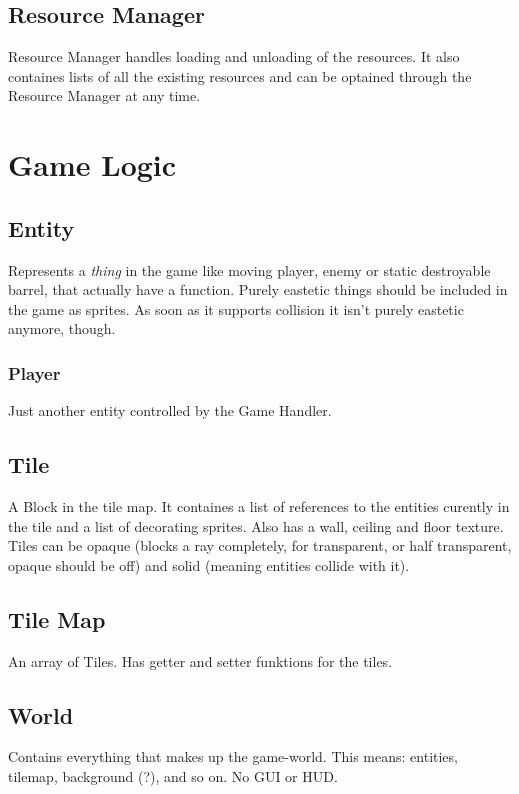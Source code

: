 \documentclass[11pt,a4paper,notitlepage]{article}
\begin{document}
\subsection{Resource Manager}
Resource Manager handles loading and unloading of the resources. It also containes lists of all the existing resources and can be optained through the Resource Manager at any time.

\section{Game Logic}

\subsection{Entity}
Represents a \textit{thing} in the game like moving player, enemy or static destroyable barrel, that actually have a function. Purely eastetic things should be included in the game as sprites. As soon as it supports collision it isn't purely eastetic anymore, though.

\subsubsection{Player}
Just another entity controlled by the Game Handler.

\subsection{Tile}
A Block in the tile map. It containes a list of references to the entities curently in the tile and a list of decorating sprites. Also has a wall, ceiling and floor texture. Tiles can be opaque (blocks a ray completely, for transparent, or half transparent, opaque should be off) and solid (meaning entities collide with it).

\subsection{Tile Map}
An array of Tiles. Has getter and setter funktions for the tiles.

\subsection{World}
Contains everything that makes up the game-world. This means: entities, tilemap, background (?), and so on. No GUI or HUD.
\end{document}
